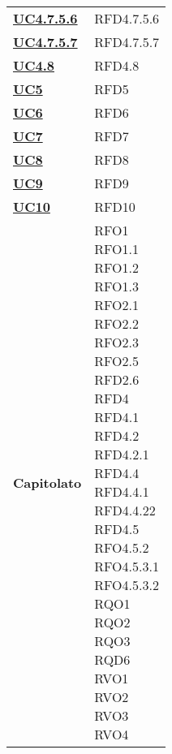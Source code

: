 \begin{longtable}[H]{| >{\centering\bfseries}p{8cm} | >{\centering\arraybackslash}p{8cm} |}
    \hyperref[spar:uc4.7.5.6]{UC4.7.5.6} & RFD4.7.5.6 \\

    \hyperref[spar:uc4.7.5.7]{UC4.7.5.7} & RFD4.7.5.7 \\

    \hyperref[ssub:uc4.8]{UC4.8} & RFD4.8 \\

    \hyperref[sub:uc5]{UC5} & RFD5 \\

    \hyperref[sub:uc6]{UC6} & RFD6 \\

    \hyperref[sub:uc7]{UC7} & RFD7 \\

    \hyperref[sub:uc8]{UC8} & RFD8 \\

    \hyperref[sub:uc9]{UC9} & RFD9 \\

    \hyperref[sub:uc10]{UC10} & RFD10 \\

    Capitolato &
        \makecell{
            \rule{0pt}{4ex}
            RFO1 \\
            RFO1.1 \\
            RFO1.2 \\
            RFO1.3 \\
            RFO2.1 \\
            RFO2.2 \\
            RFO2.3 \\
            RFO2.5 \\
            RFD2.6 \\
            RFD4 \\
            RFD4.1 \\
            RFD4.2 \\
            RFD4.2.1 \\
            RFD4.4 \\
            RFD4.4.1 \\
            RFD4.4.22 \\
            RFD4.5 \\
            RFO4.5.2 \\
            RFO4.5.3.1 \\
            RFO4.5.3.2 \\
            RQO1 \\
            RQO2 \\
            RQO3 \\
            RQD6 \\
            RVO1 \\
            RVO2 \\
            RVO3 \\
            RVO4 \\
            \rule{0pt}{4ex}
        } \\


\end{longtable}
